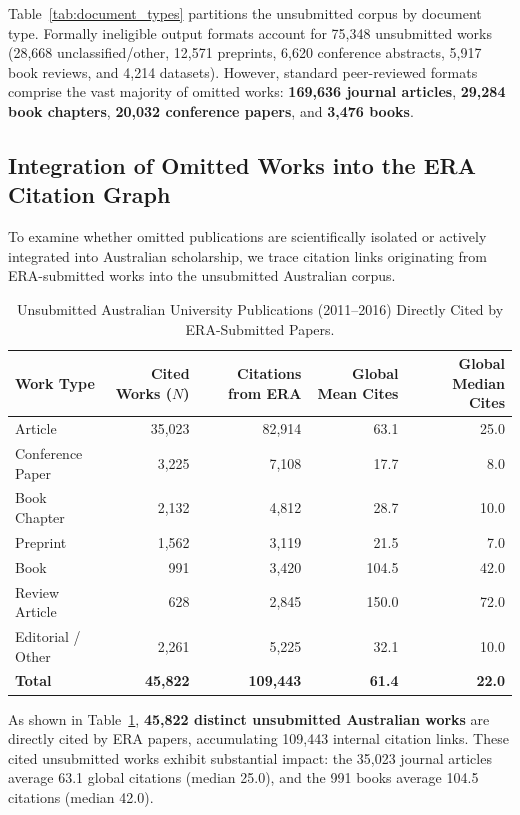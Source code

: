\documentclass[11pt,a4paper]{article}
\begin{document}
Table~\ref{tab:document_types} partitions the unsubmitted corpus by document type. Formally ineligible output formats account for 75,348 unsubmitted works (28,668 unclassified/other, 12,571 preprints, 6,620 conference abstracts, 5,917 book reviews, and 4,214 datasets). However, standard peer-reviewed formats comprise the vast majority of omitted works: \textbf{169,636 journal articles}, \textbf{29,284 book chapters}, \textbf{20,032 conference papers}, and \textbf{3,476 books}.

\subsection{Integration of Omitted Works into the ERA Citation Graph}

To examine whether omitted publications are scientifically isolated or actively integrated into Australian scholarship, we trace citation links originating from ERA-submitted works into the unsubmitted Australian corpus.

\begin{table}[htbp]
\centering
\footnotesize
\caption{Unsubmitted Australian University Publications (2011--2016) Directly Cited by ERA-Submitted Papers.}
\label{tab:cited_unsubmitted}
\begin{tabularx}{\textwidth}{lrrrr}
\toprule
\textbf{Work Type} & \textbf{Cited Works ($N$)} & \textbf{Citations from ERA} & \textbf{Global Mean Cites} & \textbf{Global Median Cites} \\
\midrule
Article             & 35,023 & 82,914 &  63.1 & 25.0 \\
Conference Paper    &  3,225 &  7,108 &  17.7 &  8.0 \\
Book Chapter        &  2,132 &  4,812 &  28.7 & 10.0 \\
Preprint            &  1,562 &  3,119 &  21.5 &  7.0 \\
Book                &    991 &  3,420 & 104.5 & 42.0 \\
Review Article      &    628 &  2,845 & 150.0 & 72.0 \\
Editorial / Other   &  2,261 &  5,225 &  32.1 & 10.0 \\
\midrule
\textbf{Total}      & \textbf{45,822} & \textbf{109,443} & \textbf{61.4} & \textbf{22.0} \\
\bottomrule
\end{tabularx}
\end{table}

As shown in Table~\ref{tab:cited_unsubmitted}, \textbf{45,822 distinct unsubmitted Australian works} are directly cited by ERA papers, accumulating 109,443 internal citation links. These cited unsubmitted works exhibit substantial impact: the 35,023 journal articles average 63.1 global citations (median 25.0), and the 991 books average 104.5 citations (median 42.0).
\end{document}
